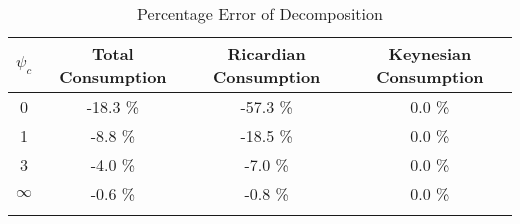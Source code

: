   \begin{table}
\begin{center}
    \caption{Percentage Error of Decomposition}\label{table:error}
\begin{tabular}{cccc}  
$\psi_c$ & Total Consumption & Ricardian Consumption & Keynesian Consumption 
\\ \toprule  
0 & -18.3 \%  & -57.3 \% & 0.0 \% \\ 
1 & -8.8 \%  & -18.5 \% & 0.0 \% \\ 
3 & -4.0 \%  & -7.0 \% & 0.0 \% \\ 
$\infty$ &  -0.6 \%  & -0.8 \% & 0.0 \% \\ 
\\ \bottomrule 
 \end{tabular}
\end{center}
\end{table}
